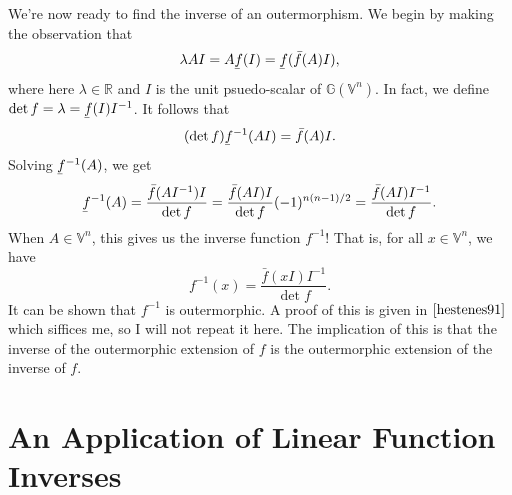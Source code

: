 \documentclass[12pt]{article}
\newcommand{\G}{\mathbb{G}}
\newcommand{\V}{\mathbb{V}}
\newcommand{\R}{\mathbb{R}}
\newcommand{\uf}{\underaccent{\bar}{f}}
\newcommand{\of}{\bar{f}}
\begin{document}
We're now ready to find the inverse of an outermorphism.  We begin by making the
observation that
\begin{equation*}
\lambda AI = A\uf(I) = \uf(\of(A)I),
\end{equation*}
where here $\lambda\in\R$ and $I$ is the unit psuedo-scalar of $\G(\V^n)$.
In fact, we define $\det f=\lambda = \uf(I)I^{-1}$.  It follows that
\begin{equation*}
(\det f)\uf^{-1}(AI) = \of(A)I.
\end{equation*}
Solving $\uf^{-1}(A)$, we get
\begin{equation*}
\uf^{-1}(A) = \frac{\of(AI^{-1})I}{\det f} = \frac{\of(AI)I}{\det f}(-1)^{n(n-1)/2} = \frac{\of(AI)I^{-1}}{\det f}.
\end{equation*}
When $A\in\V^n$, this gives us the inverse function $f^{-1}$!  That is, for all $x\in\V^n$,
we have
\begin{equation}\label{equ_inverse_formula}
f^{-1}(x) = \frac{\of(xI)I^{-1}}{\det f}.
\end{equation}
It can be shown that $f^{-1}$ is outermorphic.
A proof of this is given in $\cite{hestenes91}$ which siffices me, so I will
not repeat it here.
The implication of this is that the inverse of the outermorphic
extension of $f$ is the outermorphic extension of the inverse of $f$.

\section{An Application of Linear Function Inverses}




\end{document}
